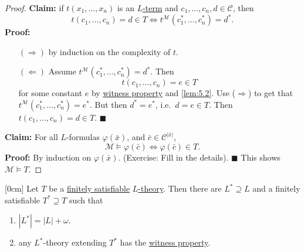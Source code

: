 \documentclass{article}
\let\models\vDash
\begin{document}
\begin{proof}
  \textbf{Claim:} if $t(x_1, \dotsc, x_n)$ is an \hyperlink{def:lterm}{$L$-term} and $c_1, \dotsc, c_n, d \in \mathscr{C}$, then
  \begin{equation*}
    t(c_1, \dotsc, c_n) = d \in T \iff t^\mathcal{M}(c_1^*, \dotsc, c_n^*) = d^*.
  \end{equation*}
  \textbf{Proof:}
  \begin{itemize}
    \item [$(\Rightarrow)$] by induction on the complexity of $t$.
    \item [$(\Leftarrow)$] Assume $t^\mathcal{M}(c_1^*, \dotsc, c_n^*) = d^*$.
    Then
    \begin{equation*}t(c_1, \dotsc, c_n) = e \in T\end{equation*}
    for some constant $e$ by \hyperlink{def:wp}{witness property} and \cref{lem:5.2}.
    Use ($\Rightarrow$) to get that $t^\mathcal{M}(c_1^*, \dotsc, c_n^*) = e^*$.
    But then $d^* = e^*$, i.e.\ $d = e \in T$.
    Then $t(c_1, \dotsc, c_n) = d \in T$. $\blacksquare$
  \end{itemize}

  \textbf{Claim:} For all $L$-formulas $\varphi(\bar{x})$, and $\bar{c} \in \mathscr{C}^{|\bar{x}|}$,
  \begin{equation*}
    \mathcal{M} \models \varphi(\bar{c}) \iff \varphi(\bar{c}) \in T.
  \end{equation*}
  \textbf{Proof:} By induction on $\varphi(\bar{x})$. (Exercise: Fill in the details).  $\blacksquare$
  This shows $\mathcal{M} \models T$.
\end{proof}
\begin{nlemma}\label{lem:5.4}
  [0cm]
  Let $T$ be a \hyperlink{def:fs}{finitely satisfiable} \hyperlink{def:ltheory}{$L$-theory}.
  Then there are $L^* \supseteq L$ and a finitely satisfiable $T^* \supseteq T$ such that
  \begin{enumerate}[label=(\roman*)]
    \item $|L^*| = |L| + \omega$.
    \item any $L^*$-theory extending $T^*$ has the \hyperlink{def:wp}{witness property}.
  \end{enumerate}
\end{nlemma}
\end{document}
